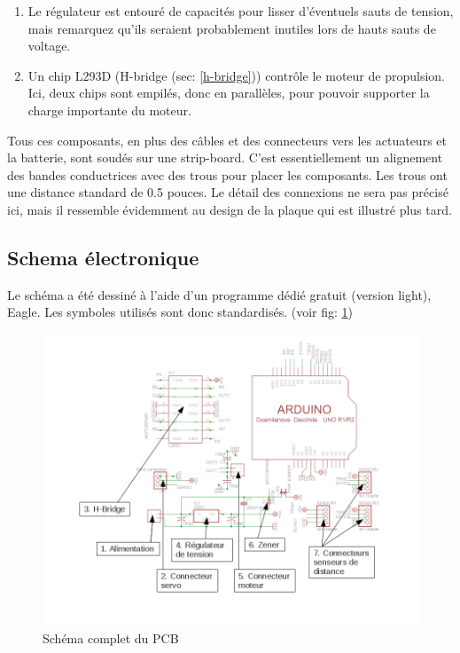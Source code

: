 \documentclass[a4paper,11pt]{report}
\begin{document}
{\begin{enumerate}
	\item Le régulateur est entouré de capacités pour lisser d'éventuels
          sauts de tension, mais remarquez qu'ils seraient probablement
          inutiles lors de hauts sauts de voltage. 

	\item Un chip L293D (H-bridge (sec: \ref{h-bridge})) contrôle le
          moteur de propulsion. Ici, deux chips sont empilés, donc en
          parallèles, pour pouvoir supporter la charge importante du moteur. 
\end{enumerate}

Tous ces composants, en plus des câbles et des connecteurs vers les actuateurs
et la batterie, sont soudés sur une strip-board. C'est essentiellement un alignement des bandes conductrices avec des trous pour placer les
composants. Les trous ont une distance standard de 0.5 pouces. Le détail des
connexions ne sera pas précisé ici, mais il ressemble évidemment 
au design de la plaque qui est illustré plus tard.   


\subsection{Schema électronique}
Le schéma a été dessiné à l'aide d'un programme dédié gratuit (version light),
Eagle. Les symboles utilisés sont donc standardisés.
(voir fig: \ref{schemaChineComplet})

\begin{figure}[h!]
\centering
\includegraphics[angle=90, width=1.1\textwidth]{figures/schema_CHI_annotated.png}
\caption{\label{schemaChineComplet}Schéma complet du PCB
}
\end{figure}

}
\end{document}
